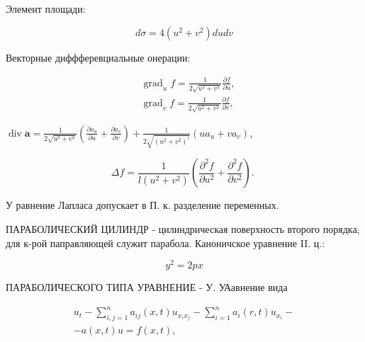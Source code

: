 \documentclass[10pt]{article}
\begin{document}
Элемент площади:



\[

d \sigma=4\left(u^{2}+v^{2}\right) d u d v

\]



Векторные диффферевциальные онерации:



\[

\begin{aligned}

& \operatorname{grad}_{u} f=\frac{1}{2 \sqrt{u^{2}+v^{2}}} \frac{\partial f}{\partial u}, \\

& \operatorname{grad}_{v} f=\frac{1}{2 \sqrt{u^{2}+v^{2}}} \frac{\partial f}{\partial v},

\end{aligned}

\]



$\operatorname{div} \boldsymbol{a}=\frac{1}{2 \sqrt{u^{2}+v^{2}}}\left(\frac{\partial a_{u}}{\partial u}+\frac{\partial a_{v}}{\partial v}\right)+\frac{1}{2 \sqrt{\left(u^{2}+v^{2}\right)^{i}}}\left(u a_{u}+v a_{v}\right)$,



\[

\Delta f=\frac{1}{l\left(u^{2}+v^{2}\right)}\left(\frac{\partial^{2} f}{\partial u^{2}}+\frac{\partial^{2} f}{\partial v^{2}}\right) \text {. }

\]



У равнение Лапласа допускает в П. к. разделение переменных.



ПАРАБОЛИЧЕСКИЙ ЦИЛИНДР - цилиндрическая поверхность второго порядка, для к-рой паправляющей служит парабола. Каноничское уравнение II. ц.:



\[

y^{2}=2 p x

\]



ПАРАБОЛИЧЕСКОГО ТИПА УРАВНЕНИЕ - У. УАавнение вида



\[

\begin{gathered}

u_{t}-\sum_{i, j=1}^{n} a_{i j}(x, t) u_{x_{i} x_{j}}-\sum_{i=1}^{n} a_{i}(r, t) u_{x_{i}}- \\

-a(x, t) u=f(x, t),

\end{gathered}

\]
\end{document}
